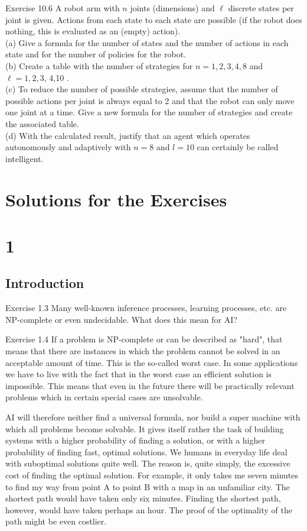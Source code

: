\documentclass[10pt]{book}
\begin{document}
Exercise 10.6 A robot arm with $n$ joints (dimensions) and $\ell$ discrete states per joint is given. Actions from each state to each state are possible (if the robot does nothing, this is evaluated as an (empty) action).\\
(a) Give a formula for the number of states and the number of actions in each state and for the number of policies for the robot.\\
(b) Create a table with the number of strategies for $n=1,2,3,4,8$ and $\ell=1,2,3$, 4,10 .\\
(c) To reduce the number of possible strategies, assume that the number of possible actions per joint is always equal to 2 and that the robot can only move one joint at a time. Give a new formula for the number of strategies and create the associated table.\\
(d) With the calculated result, justify that an agent which operates autonomously and adaptively with $n=8$ and $l=10$ can certainly be called intelligent.

\section*{Solutions for the Exercises}
\section*{1}
\subsection*{Introduction}
Exercise 1.3 Many well-known inference processes, learning processes, etc. are NP-complete or even undecidable. What does this mean for AI?


Exercise 1.4 If a problem is NP-complete or can be described as "hard", that means that there are instances in which the problem cannot be solved in an acceptable amount of time. This is the so-called worst case. In some applications we have to live with the fact that in the worst case an efficient solution is impossible. This means that even in the future there will be practically relevant problems which in certain special cases are unsolvable.

AI will therefore neither find a universal formula, nor build a super machine with which all problems become solvable. It gives itself rather the task of building systems with a higher probability of finding a solution, or with a higher probability of finding fast, optimal solutions. We humans in everyday life deal with suboptimal solutions quite well. The reason is, quite simply, the excessive cost of finding the optimal solution. For example, it only takes me seven minutes to find my way from point A to point B with a map in an unfamiliar city. The shortest path would have taken only six minutes. Finding the shortest path, however, would have taken perhaps an hour. The proof of the optimality of the path might be even costlier.
\end{document}
